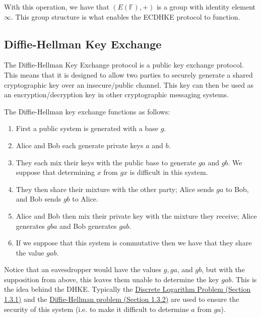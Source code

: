 \documentclass{article}
\theoremstyle{plain}
\theoremstyle{definition}
\newcommand{\bb}[1]{\mathbb{#1}}
\begin{document}
                With this operation, we have that $(E(\bb{F}), +)$ is a group with identity element $\infty$.
                This group structure is what enables the ECDHKE protocol to function.



        \subsection{Diffie-Hellman Key Exchange}\label{DHKE}


                The Diffie-Hellman Key Exchange protocol is a public key exchange protocol.
                This means that it is designed to allow two parties to securely generate a shared cryptographic key over an insecure/public channel.
                This key can then be used as an encryption/decryption key in other cryptographic messaging systems.

                The Diffie-Hellman key exchange functions as follows:
                \begin{enumerate}[Step 1.]
                \item First a public system is generated with a base $g$.
                \item Alice and Bob each generate private keys $a$ and $b$.
                \item They each mix their keys with the public base to generate $ga$ and $gb$. We suppose that determining $x$ from $gx$ is difficult in this system.
                \item They then share their mixture with the other party; Alice sends $ga$ to Bob, and Bob sends $gb$ to Alice.
                \item Alice and Bob then mix their private key with the mixture they receive; Alice generates $gba$ and Bob generates $gab$.
                \item If we suppose that this system is commutative then we have that they share the value $gab$.
                \end{enumerate}


                Notice that an eavesdropper would have the values $g, ga$, and $gb$, but with the supposition from above, this leaves them unable to determine the key $gab$.
                This is the idea behind the DHKE. 
                Typically the \hyperref[DLP]{Discrete Logarithm Problem (Section 1.3.1)} and the \hyperref[DHP]{Diffie-Hellman problem (Section 1.3.2)} are used to ensure the security of this system (i.e. to make it difficult to determine $a$ from $ga$).
\end{document}
